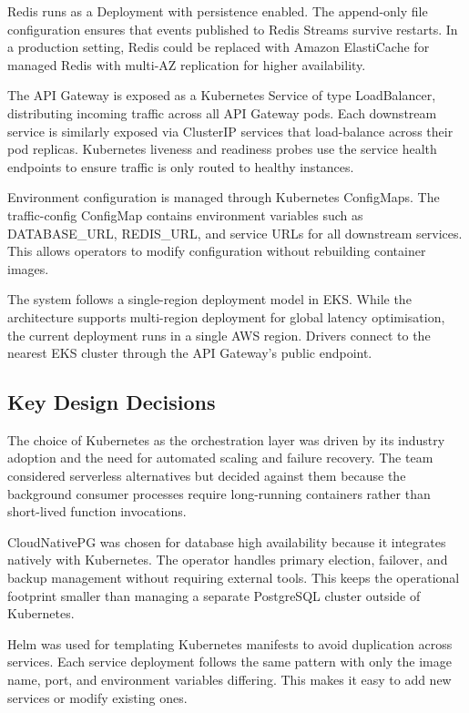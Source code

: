 \documentclass{article}
\begin{document}
Redis runs as a Deployment with persistence enabled. The append-only file configuration ensures that events published to Redis Streams survive restarts. In a production setting, Redis could be replaced with Amazon ElastiCache for managed Redis with multi-AZ replication for higher availability.

The API Gateway is exposed as a Kubernetes Service of type LoadBalancer, distributing incoming traffic across all API Gateway pods. Each downstream service is similarly exposed via ClusterIP services that load-balance across their pod replicas. Kubernetes liveness and readiness probes use the service health endpoints to ensure traffic is only routed to healthy instances.

Environment configuration is managed through Kubernetes ConfigMaps. The traffic-config ConfigMap contains environment variables such as DATABASE_URL, REDIS_URL, and service URLs for all downstream services. This allows operators to modify configuration without rebuilding container images.

The system follows a single-region deployment model in EKS. While the architecture supports multi-region deployment for global latency optimisation, the current deployment runs in a single AWS region. Drivers connect to the nearest EKS cluster through the API Gateway's public endpoint.

\subsection{Key Design Decisions}
The choice of Kubernetes as the orchestration layer was driven by its industry adoption and the need for automated scaling and failure recovery. The team considered serverless alternatives but decided against them because the background consumer processes require long-running containers rather than short-lived function invocations.

CloudNativePG was chosen for database high availability because it integrates natively with Kubernetes. The operator handles primary election, failover, and backup management without requiring external tools. This keeps the operational footprint smaller than managing a separate PostgreSQL cluster outside of Kubernetes.

Helm was used for templating Kubernetes manifests to avoid duplication across services. Each service deployment follows the same pattern with only the image name, port, and environment variables differing. This makes it easy to add new services or modify existing ones.
\end{document}
